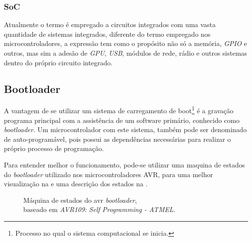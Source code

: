 \subsubsection{SoC}

Atualmente o termo é empregado a circuitos integrados com uma vasta quantidade de sistemas integrados, diferente do
termo empregado nos microcontroladores, a expressão tem como o propósito não só a memória, \textit{GPIO} e outros, mas sim
a adesão de \textit{GPU}, \textit{USB}, módulos de rede, rádio e outros sistemas dentro do próprio circuito integrado.


\subsection{Bootloader}

A vantagem de se utilizar um sistema de carregamento de boot\footnote{Processo no qual o sistema computacional se inicia.} é
a gravação programa principal com a assistência de um software primário, conhecido como \textit{bootloader}. Um microcontrolador
com este sistema, também pode ser denominado de auto-programável, pois possui as dependências necessárias para realizar o próprio
processo de programação.

Para entender melhor o funcionamento, pode-se utilizar uma maquina de estados do \textit{bootloader} utilizado nos microcontroladores
AVR, para uma melhor visualização na  e uma descrição dos estados na .

\begin{figure}[ht!]
  \centering
  \caption[Máquina de estados do avr \textit{bootloader}]{\label{fig:sm_bootloader}}{Máquina de estados
  do avr \textit{bootloader},\\ baseado em \textit{AVR109: Self Programming - ATMEL}.}
\end{figure}

